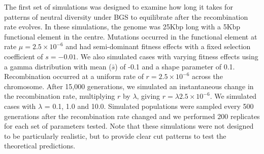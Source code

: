 \documentclass[11pt,twoside, onecolumn]{GSA_format}
\begin{document}
The first set of simulations was designed to examine how long it takes for patterns of neutral diversity under BGS to equilibrate after the recombination rate evolves. In these simulations, the genome was 25Kbp long with a 5Kbp functional element in the centre. Mutations occurred in the functional element at rate $\mu = 2.5\times10^{-6}$ and had semi-dominant fitness effects with a fixed selection coefficient of $s = -0.01$. We also simulated cases with varying fitness effects using a gamma distribution with mean ($\bar{s}$) of -0.1 and a shape parameter of 0.1. Recombination occurred at a uniform rate of $r = 2.5\times10^{-6}$ across the chromosome. After 15,000 generations, we simulated an instantaneous change in the recombination rate, multiplying $r$ by $\lambda$, giving $r = \lambda2.5\times10^{-6}$. We simulated cases with $\lambda$ = 0.1, 1.0 and 10.0. Simulated populations were sampled every 500 generations after the recombination rate changed and we performed 200 replicates for each set of parameters tested. Note that these simulations were not designed to be particularly realistic, but to provide clear cut patterns to test the theoretical predictions. \\
\end{document}
